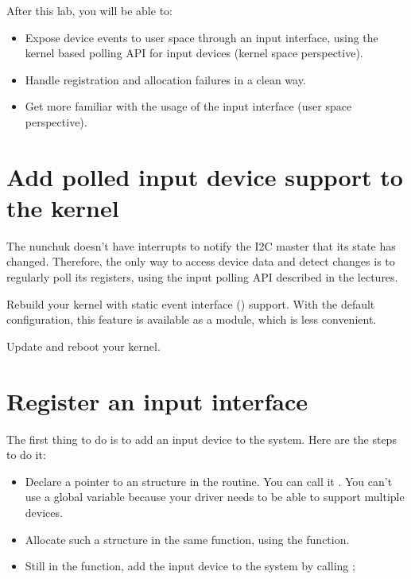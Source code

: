 
After this lab, you will be able to:

\begin{itemize}
\item Expose device events to user space through an input interface,
      using the kernel based polling API for input devices
      (kernel space perspective).
\item Handle registration and allocation failures in a clean
      way.
\item Get more familiar with the usage of the input interface
      (user space perspective).
\end{itemize}

\section{Add polled input device support to the kernel}

The nunchuk doesn't have interrupts to notify the I2C master that
its state has changed. Therefore, the only way to access device data
and detect changes is to regularly poll its registers, using the input
polling API described in the lectures.

Rebuild your kernel with static event interface
() support. With the default
configuration, this feature is available as a module, which is less
convenient.

Update and reboot your kernel.

\section{Register an input interface}

The first thing to do is to add an input device to the system. Here are
the steps to do it:

\begin{itemize}
\item Declare a pointer to an  structure in the
       routine. You can call it .
      You can't use a global variable because your driver needs to be
      able to support multiple devices.
\item Allocate such a structure in the same function, using the
       function.
\item Still in the  function, add the input device to
      the system by calling ;
\end{itemize}

